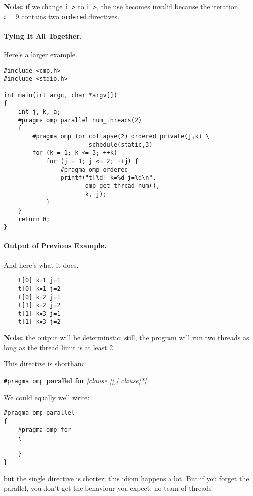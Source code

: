 {\bf Note:} if we change {\tt i \textgreater{}} to {\tt i \textgreater{}}, 
the use becomes invalid because the iteration $i=9$ contains two {\tt ordered}
directives.

  \paragraph{Tying It All Together.} Here's a larger example.

  \begin{lstlisting}
#include <omp.h>
#include <stdio.h>

int main(int argc, char *argv[])
{
    int j, k, a;
    #pragma omp parallel num_threads(2)
    {
        #pragma omp for collapse(2) ordered private(j,k) \
                        schedule(static,3)
        for (k = 1; k <= 3; ++k)
            for (j = 1; j <= 2; ++j) {
                #pragma omp ordered
                printf("t[%d] k=%d j=%d\n",
                       omp_get_thread_num(),
                       k, j);
            }
    }
    return 0;
}
  \end{lstlisting}

\paragraph{Output of Previous Example.} And here's what it does.

{\small
  \begin{lstlisting}
    t[0] k=1 j=1
    t[0] k=1 j=2
    t[0] k=2 j=1
    t[1] k=2 j=2
    t[1] k=3 j=1
    t[1] k=3 j=2
  \end{lstlisting}
}

  {\bf Note:} the output will be determinstic; still, the program will run two threads as
  long as the thread limit is at least 2.

This directive is shorthand:

  \begin{center}
    {\tt \#pragma omp }{\bf parallel for} {\it [clause [[,] clause]*]}
  \end{center}

We could equally well write:
{\small
  \begin{lstlisting}
#pragma omp parallel
{
    #pragma omp for
    {

    }
}
  \end{lstlisting}
}
but the single directive is shorter; this idiom happens a lot. But if you forget the parallel, you don't get the behaviour you expect: no team of threads!

